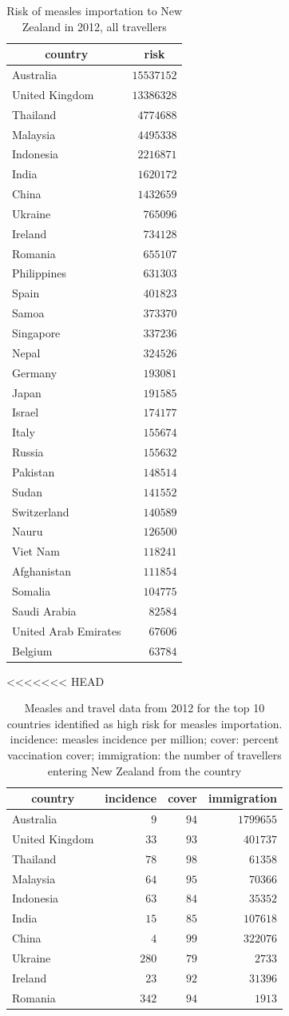 \documentclass{article}
\begin{document}
\begin{itemize}
\begin{table}
\caption{Risk of measles importation to New Zealand in 2012, all travellers}
\begin{center}
\begin{tabular}{lr}
\hline\hline
\multicolumn{1}{c}{country}&\multicolumn{1}{c}{risk}\tabularnewline
\hline
Australia&$15537152$\tabularnewline
United Kingdom&$13386328$\tabularnewline
Thailand&$ 4774688$\tabularnewline
Malaysia&$ 4495338$\tabularnewline
Indonesia&$ 2216871$\tabularnewline
India&$ 1620172$\tabularnewline
China&$ 1432659$\tabularnewline
Ukraine&$  765096$\tabularnewline
Ireland&$  734128$\tabularnewline
Romania&$  655107$\tabularnewline
Philippines&$  631303$\tabularnewline
Spain&$  401823$\tabularnewline
Samoa&$  373370$\tabularnewline
Singapore&$  337236$\tabularnewline
Nepal&$  324526$\tabularnewline
Germany&$  193081$\tabularnewline
Japan&$  191585$\tabularnewline
Israel&$  174177$\tabularnewline
Italy&$  155674$\tabularnewline
Russia&$  155632$\tabularnewline
Pakistan&$  148514$\tabularnewline
Sudan&$  141552$\tabularnewline
Switzerland&$  140589$\tabularnewline
Nauru&$  126500$\tabularnewline
Viet Nam&$  118241$\tabularnewline
Afghanistan&$  111854$\tabularnewline
Somalia&$  104775$\tabularnewline
Saudi Arabia&$   82584$\tabularnewline
United Arab Emirates&$   67606$\tabularnewline
Belgium&$   63784$\tabularnewline
\hline
\end{tabular}\end{center}\label{table:risk12}
\end{table}


<<<<<<< HEAD

\begin{table}
\caption{Measles and travel data from 2012 for the top 10 countries identified as high risk for measles importation. incidence: measles incidence per million; cover: percent vaccination cover; immigration: the number of travellers entering New Zealand from the country}
\begin{center}
\begin{tabular}{lrrr}
\hline\hline
\multicolumn{1}{c}{country}&\multicolumn{1}{c}{incidence}&\multicolumn{1}{c}{cover}&\multicolumn{1}{c}{immigration}\tabularnewline
\hline
Australia&$  9$&$94$&$1799655$\tabularnewline
United Kingdom&$ 33$&$93$&$ 401737$\tabularnewline
Thailand&$ 78$&$98$&$  61358$\tabularnewline
Malaysia&$ 64$&$95$&$  70366$\tabularnewline
Indonesia&$ 63$&$84$&$  35352$\tabularnewline
India&$ 15$&$85$&$ 107618$\tabularnewline
China&$  4$&$99$&$ 322076$\tabularnewline
Ukraine&$280$&$79$&$   2733$\tabularnewline
Ireland&$ 23$&$92$&$  31396$\tabularnewline
Romania&$342$&$94$&$   1913$\tabularnewline
\hline
\end{tabular}\end{center}\label{table:toprisk}
\end{table}




\end{itemize}
\end{document}
